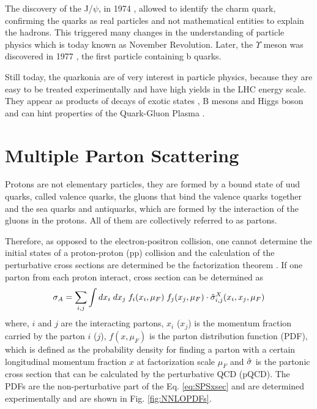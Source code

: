 The discovery of the J/$\psi$, in 1974 \cite{E598:1974sol, SLAC-SP-017:1974ind}, allowed to identify the charm quark, confirming the quarks as real particles and not mathematical entities to explain the hadrons. This triggered many changes in the understanding of particle physics which is today known as November Revolution. Later, the $\Upsilon$ meson was discovered in 1977 \cite{E288:1977xhf}, the first particle containing b quarks.

Still today, the quarkonia are of very interest in particle physics, because they are easy to be treated experimentally and have high yields in the LHC energy scale. They appear as products of decays of exotic states \cite{CMS:2013jru, LHCb:2021uow, LHCb:2021vvq}, B mesons and Higgs boson \cite{ATLAS:2015vss} and can hint properties of the Quark-Gluon Plasma \cite{Matsui:1986dk, Wolschin:2016oua}.

\section{Multiple Parton Scattering}

Protons are not elementary particles, they are formed by a bound state of uud quarks, called valence quarks, the gluons that bind the valence quarks together and the sea quarks and antiquarks, which are formed by the interaction of the gluons in the protons. All of them are collectively referred to as partons.

Therefore, as opposed to the electron-positron collision, one cannot determine the initial states of a proton-proton (pp) collision and the calculation of the perturbative cross sections are determined be the factorization theorem \cite{Collins:1989gx}. If one parton from each proton interact, cross section can be determined as
\begin{equation}\label{eq:SPSxsec}
    \sigma_{A} = \sum_{i,j}\int dx_i \; dx_j \; f_i(x_i, \mu_F) \; f_j(x_j, \mu_F) \cdot \Hat{\sigma}_{i,j}^X(x_i, x_j, \mu_F)  
\end{equation}
where, $i$ and $j$ are the interacting partons, $x_i$ ($x_j$) is the momentum fraction carried by the parton $i$ ($j$), $f(x, \mu_F)$ is the parton distribution function (PDF), which is defined as the probability density for finding a parton with a certain longitudinal momentum fraction $x$ at factorization scale $\mu_F$ and $\Hat{\sigma}$ is the partonic cross section that can be calculated by the perturbative QCD (pQCD). The PDFs are the non-perturbative part of the Eq. \ref{eq:SPSxsec} and are determined experimentally \cite{NNPDF:2017mvq} and are shown in Fig. \ref{fig:NNLOPDFs}.

